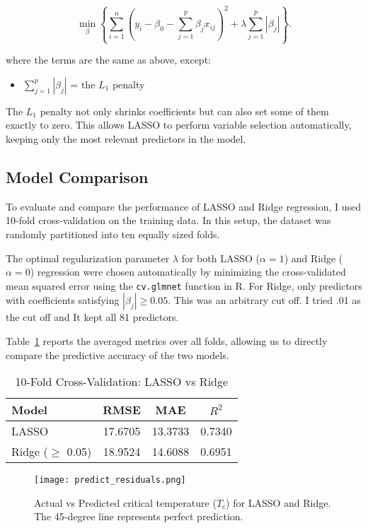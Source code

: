 \documentclass[conference]{IEEEtran}
\begin{document}
\[
\min_{\beta} \left\{ \sum_{i=1}^{n} \left(y_i - \beta_0 - \sum_{j=1}^{p} \beta_j x_{ij}\right)^2 
+ \lambda \sum_{j=1}^{p} |\beta_j| \right\}.
\]

where the terms are the same as above, except:
\begin{itemize}
    \item $\sum_{j=1}^{p} |\beta_j|$ = the $L_1$ penalty
\end{itemize}

The $L_1$ penalty not only shrinks coefficients but can also set some of them exactly to zero. This allows LASSO to perform variable selection automatically, keeping only the most relevant predictors in the model.

\subsection{Model Comparison}
To evaluate and compare the performance of LASSO and Ridge regression, 
I used 10-fold cross-validation on the training data. 
In this setup, the dataset was randomly partitioned into ten equally sized folds. 

The optimal regularization parameter $\lambda$ for both LASSO ($\alpha=1$) 
and Ridge ($\alpha=0$) regression were chosen automatically by minimizing the 
cross-validated mean squared error using the \texttt{cv.glmnet} function in R. 
For Ridge, only predictors with coefficients satisfying $|\beta_j| \geq 0.05$. This was an arbitrary cut off. 
I tried .01 as the cut off and It kept all 81 predictors.

Table~\ref{tab:cv_compare} reports the averaged metrics over all folds, 
allowing us to directly compare the predictive accuracy of the two models.

\begin{table}[htbp]
\centering
\caption{10-Fold Cross-Validation: LASSO vs Ridge}
\label{tab:cv_compare}
\begin{tabular}{lccc}
\toprule
Model & RMSE & MAE & $R^2$ \\
\midrule
LASSO  & 17.6705 & 13.3733 & 0.7340 \\
Ridge ($\geq$ 0.05) & 18.9524 & 14.6088 & 0.6951 \\
\bottomrule
\end{tabular}
\end{table}


\begin{figure}[htbp]
    \centering
    \texttt{[image: predict\_residuals.png]}
    \caption{Actual vs Predicted critical temperature ($T_c$) for LASSO and Ridge. 
    The 45-degree line represents perfect prediction.}
    \label{fig:actual_vs_pred}
\end{figure}
\end{document}
